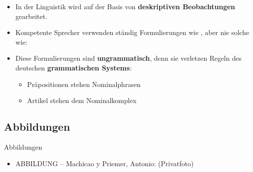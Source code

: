 \begin{frame}

\begin{itemize}
	
	\item In der Linguistik wird auf der Basis von \textbf{deskriptiven Beobachtungen} gearbeitet.
	
	\medskip
	
	\item Kompetente Sprecher verwenden ständig Formulierungen wie , aber nie solche wie:
	
	
	
	\z
	
	\medskip
	\item Diese Formulierungen sind \textbf{ungrammatisch}, denn sie verletzen Regeln des deutschen \textbf{grammatischen Systems}:
	
	\begin{itemize}
		\item Präpositionen stehen  Nominalphrasen
		\item Artikel stehen  dem Nominalkomplex
	\end{itemize}	
	
\end{itemize}

\end{frame}


\subsection{Abbildungen}


\begin{frame}{Abbildungen}
\small

\begin{itemize}

	
	\item ABBILDUNG -- Machicao y Priemer, Antonio:  (Privatfoto)
\end{itemize}	

\end{frame}

